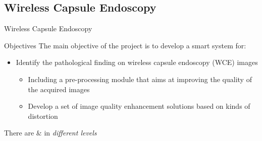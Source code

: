 \documentclass{libs/ufc_format}
\begin{document}
\subsection{Wireless Capsule Endoscopy}
\begin{frame}{Wireless Capsule Endoscopy}


    \pause


\end{frame}

\begin{frame}{Objectives}
    The main objective of the project is to develop a smart system for:
    \begin{itemize}
        \item Identify the pathological finding on wireless capsule endoscopy (WCE) images
              \begin{itemize}
                  \item Including a pre-processing module that aims at improving the quality of the acquired images
                  \item Develop a set of image quality enhancement solutions based on kinds of distortion
              \end{itemize}


    \end{itemize}

    \vspace{0.2cm}

    There are  $\&$ in \emph{different levels}
\end{frame}
\end{document}
